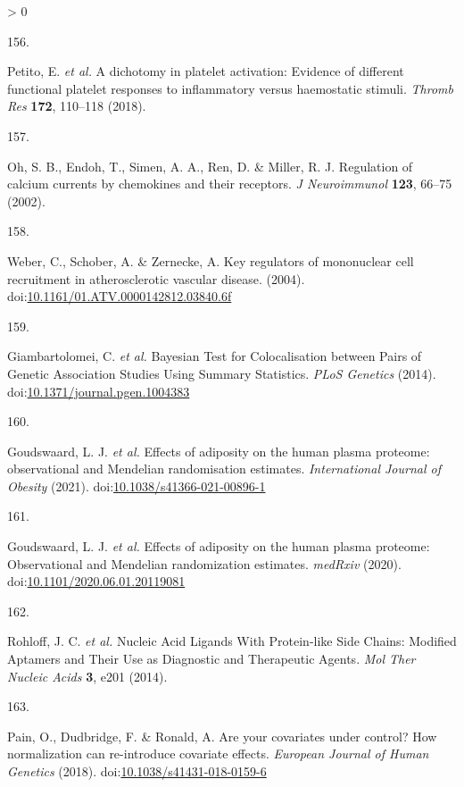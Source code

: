 \documentclass[11pt,twoside]{bristolthesis}
\newlength{\cslhangindent}
\newlength{\csllabelwidth}
\newenvironment{CSLReferences}[2] %
 {%
  \setlength{\parindent}{0pt}
  \ifodd #1 \everypar{\setlength{\hangindent}{\cslhangindent}}\ignorespaces\fi
  \ifnum #2 > 0
  \setlength{\parskip}{#2\baselineskip}
  \fi
 }%
 {}
\newcommand{\CSLLeftMargin}[1]{\parbox[t]{\csllabelwidth}{#1}}
\newcommand{\CSLRightInline}[1]{\parbox[t]{\linewidth - \csllabelwidth}{#1}\break}
\begin{document}
\begin{CSLReferences}{0}{0}
\leavevmode\hypertarget{ref-Petito2018}{}%
\CSLLeftMargin{156. }
\CSLRightInline{Petito, E. \emph{et al.} {A dichotomy in platelet activation: Evidence of different functional platelet responses to inflammatory versus haemostatic stimuli}. \emph{Thromb Res} \textbf{172}, 110--118 (2018).}

\leavevmode\hypertarget{ref-Oh2002}{}%
\CSLLeftMargin{157. }
\CSLRightInline{Oh, S. B., Endoh, T., Simen, A. A., Ren, D. \& Miller, R. J. {Regulation of calcium currents by chemokines and their receptors}. \emph{J Neuroimmunol} \textbf{123}, 66--75 (2002).}

\leavevmode\hypertarget{ref-Weber2004}{}%
\CSLLeftMargin{158. }
\CSLRightInline{Weber, C., Schober, A. \& Zernecke, A. {Key regulators of mononuclear cell recruitment in atherosclerotic vascular disease}. (2004). doi:\href{https://doi.org/10.1161/01.ATV.0000142812.03840.6f}{10.1161/01.ATV.0000142812.03840.6f}}

\leavevmode\hypertarget{ref-Giambartolomei2014}{}%
\CSLLeftMargin{159. }
\CSLRightInline{Giambartolomei, C. \emph{et al.} {Bayesian Test for Colocalisation between Pairs of Genetic Association Studies Using Summary Statistics}. \emph{PLoS Genetics} (2014). doi:\href{https://doi.org/10.1371/journal.pgen.1004383}{10.1371/journal.pgen.1004383}}

\leavevmode\hypertarget{ref-Goudswaard2021}{}%
\CSLLeftMargin{160. }
\CSLRightInline{Goudswaard, L. J. \emph{et al.} {Effects of adiposity on the human plasma proteome: observational and Mendelian randomisation estimates}. \emph{International Journal of Obesity} (2021). doi:\href{https://doi.org/10.1038/s41366-021-00896-1}{10.1038/s41366-021-00896-1}}

\leavevmode\hypertarget{ref-Goudswaard2020}{}%
\CSLLeftMargin{161. }
\CSLRightInline{Goudswaard, L. J. \emph{et al.} {Effects of adiposity on the human plasma proteome: Observational and Mendelian randomization estimates}. \emph{medRxiv} (2020). doi:\href{https://doi.org/10.1101/2020.06.01.20119081}{10.1101/2020.06.01.20119081}}

\leavevmode\hypertarget{ref-Rohloff2014}{}%
\CSLLeftMargin{162. }
\CSLRightInline{Rohloff, J. C. \emph{et al.} {Nucleic Acid Ligands With Protein-like Side Chains: Modified Aptamers and Their Use as Diagnostic and Therapeutic Agents}. \emph{Mol Ther Nucleic Acids} \textbf{3}, e201 (2014).}

\leavevmode\hypertarget{ref-Pain2018}{}%
\CSLLeftMargin{163. }
\CSLRightInline{Pain, O., Dudbridge, F. \& Ronald, A. {Are your covariates under control? How normalization can re-introduce covariate effects}. \emph{European Journal of Human Genetics} (2018). doi:\href{https://doi.org/10.1038/s41431-018-0159-6}{10.1038/s41431-018-0159-6}}


\end{CSLReferences}
\end{document}
